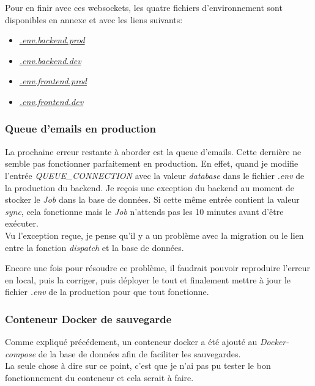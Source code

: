 \documentclass[
    iai, %
    il, %
]{heig-tb}
\begin{document}
Pour en finir avec ces \Gls{websockets}, les quatre fichiers d'environnement sont disponibles en annexe et avec les liens suivants:
\begin{itemize}
    \item \href{https://github.com/heig-fablab/fablab-manager/blob/main/.env.prod.example}{\emph{.env.backend.prod}}
    \item \href{https://github.com/heig-fablab/fablab-manager/blob/main/.env.dev.example}{\emph{.env.backend.dev}}
    \item \href{https://github.com/heig-fablab/fablab-manager-frontend/blob/main/.env.prod.example}{\emph{.env.frontend.prod}}
    \item \href{https://github.com/heig-fablab/fablab-manager-frontend/blob/main/.env.dev.example}{\emph{.env.frontend.dev}}
\end{itemize}

\subsubsection{Queue d'emails en production}
La prochaine erreur restante à aborder est la queue d'emails.
Cette dernière ne semble pas fonctionner parfaitement en production.
En effet, quand je modifie l'entrée \emph{QUEUE\_CONNECTION} avec la valeur \emph{database} dans le fichier \emph{.env} de la production du \Gls{backend}.
Je reçois une exception du \Gls{backend} au moment de stocker le \emph{Job} dans la base de données.
Si cette même entrée contient la valeur \emph{sync}, cela fonctionne mais le \emph{Job} n'attends pas les 10 minutes avant d'être exécuter. \\
Vu l'exception reçue, je pense qu'il y a un problème avec la migration ou le lien entre la fonction \emph{dispatch} et la base de données.

Encore une fois pour résoudre ce problème, il faudrait pouvoir reproduire l'erreur en local, puis la corriger, puis déployer le tout et finalement mettre à jour le fichier \emph{.env} de la production pour que tout fonctionne.

\subsubsection{Conteneur Docker de sauvegarde}
Comme expliqué précédement, un \Gls{conteneur} \Gls{docker} a été ajouté au \emph{Docker-compose} de la base de données afin de faciliter les sauvegardes.\\
La seule chose à dire sur ce point, c'est que je n'ai pas pu tester le bon fonctionnement du \Gls{conteneur} et cela serait à faire.
\end{document}
